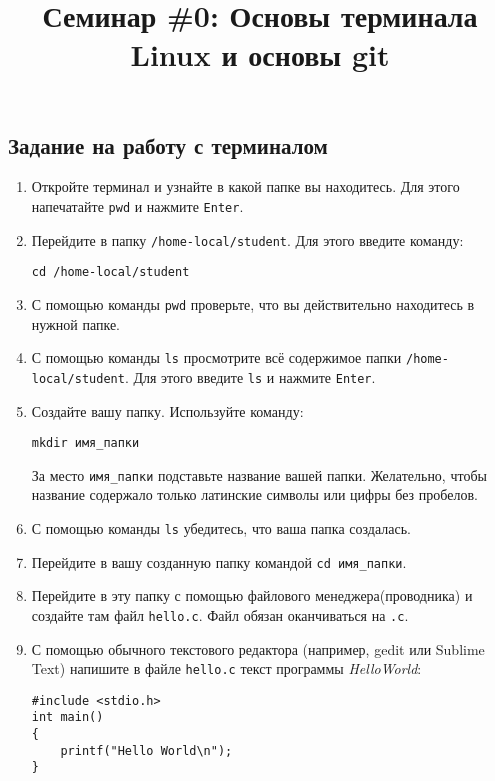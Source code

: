 \documentclass{article}
\begin{document}
\title{Семинар \#0: Основы терминала Linux и основы git \vspace{-5ex}}\date{}\maketitle

\subsection*{Задание на работу с терминалом}
\begin{enumerate}
\item Откройте терминал и узнайте в какой папке вы находитесь. Для этого напечатайте \texttt{pwd} и нажмите \texttt{Enter}.
\item Перейдите в папку  \texttt{/home-local/student}. Для этого введите команду:
\begin{verbatim}
cd /home-local/student
\end{verbatim}
\item С помощью команды \texttt{pwd} проверьте, что вы действительно находитесь в нужной папке.
\item С помощью команды \texttt{ls} просмотрите всё содержимое папки \texttt{/home-local/student}. Для этого введите \texttt{ls} и нажмите \texttt{Enter}.
\item Создайте вашу папку. Используйте команду:
\begin{verbatim}
mkdir имя_папки
\end{verbatim}
За место \texttt{имя\_папки}  подставьте название вашей папки. Желательно, чтобы название содержало только латинские символы или цифры без пробелов.
\item С помощью команды \texttt{ls} убедитесь, что ваша папка создалась.
\item Перейдите в вашу созданную папку командой \texttt{cd имя\_папки}.

\item Перейдите в эту папку с помощью файлового менеджера(проводника) и создайте там файл \texttt{hello.c}. Файл обязан оканчиваться на \texttt{.c}.

\item С помощью обычного текстового редактора (например, gedit или Sublime Text) напишите в файле \texttt{hello.c} текст программы \textit{HelloWorld}:
\begin{lstlisting}
#include <stdio.h>
int main() 
{
    printf("Hello World\n");
}
\end{lstlisting}


\end{enumerate}
\end{document}
